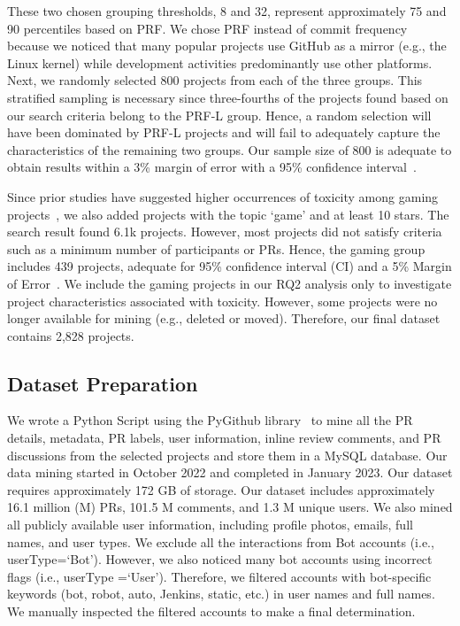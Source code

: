 These two chosen grouping thresholds, 8 and 32, represent approximately 75 and 90 percentiles based on PRF. We chose PRF instead of commit frequency because we noticed that many popular projects use GitHub as a mirror (e.g., the Linux kernel) while development activities predominantly use other platforms. 
Next, we randomly selected 800 projects from each of the three groups.
 This stratified sampling is necessary since three-fourths of the projects found based on our search criteria belong to the PRF-L  group. Hence, a random selection will have been dominated by PRF-L projects and will fail to adequately capture the characteristics of the remaining two groups. Our sample size of 800 is adequate to obtain results within a 3\% margin of error with a 95\% confidence interval~\cite{cochran1977sampling}. 


Since prior studies have suggested higher occurrences of toxicity among gaming projects~\cite{miller2022did}, we also added projects with the topic `game' and at least 10 stars. The search result found 6.1k projects. However,  most projects did not satisfy criteria such as a minimum number of participants or PRs. Hence, the gaming group includes 439 projects, adequate for  95\% confidence interval (CI) and a 5\% Margin of Error~\cite{cochran1977sampling}. We include the gaming projects in our RQ2 analysis only to investigate project characteristics associated with toxicity. However, some projects were no longer available for mining (e.g., deleted or moved). Therefore, our final dataset contains 2,828 projects.








\subsection{Dataset Preparation}

 We wrote a Python Script using the PyGithub library~\cite{pygit} to mine all the PR details, metadata, PR labels, user information, inline review comments, and PR discussions from the selected projects and store them in a MySQL database. Our data mining started in October 2022 and completed in January 2023. Our dataset requires approximately 172 GB of storage.
Our dataset includes approximately 16.1 million (M) PRs, 101.5 M comments, and 1.3 M unique users.  We also mined all publicly available user information, including profile photos, emails, full names, and user types. We exclude all the interactions from Bot accounts (i.e., userType=`Bot'). However, we also noticed many bot accounts using incorrect flags (i.e., userType =`User'). Therefore, we filtered accounts with bot-specific keywords (bot, robot, auto, Jenkins, static, etc.) in user names and full names. We manually inspected the filtered accounts to make a final determination.


